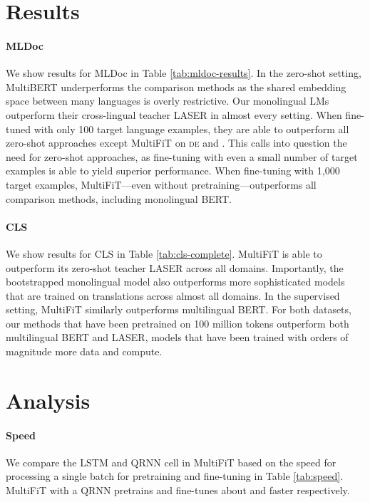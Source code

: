 \documentclass[11pt,a4paper]{article}
\newcommand{\de}{\textsc{de}\xspace}
\begin{document}
\section{Results} \label{sec:results}



\paragraph{MLDoc} We show results for MLDoc in Table \ref{tab:mldoc-results}. In the zero-shot setting, MultiBERT underperforms the comparison methods as the shared embedding space between many languages is overly restrictive. Our monolingual LMs outperform their cross-lingual teacher LASER in almost every setting. When fine-tuned with only 100 target language examples, they are able to outperform all zero-shot approaches except MultiFiT on \de{} and \fr. This calls into question the need for zero-shot approaches, as fine-tuning with even a small number of target examples is able to yield superior performance. When fine-tuning with 1,000 target examples, MultiFiT---even without pretraining---outperforms all comparison methods, including monolingual BERT.

\paragraph{CLS} We show results for CLS in Table \ref{tab:cls-complete}. MultiFiT is able to outperform its zero-shot teacher LASER across all domains. Importantly, the bootstrapped monolingual model also outperforms more sophisticated models that are trained on translations across almost all domains. In the supervised setting, MultiFiT similarly outperforms multilingual BERT. For both datasets, our methods that have been pretrained on 100 million tokens outperform both multilingual BERT and LASER, models that have been trained with orders of magnitude more data and compute.




\section{Analysis}

\paragraph{Speed} We compare the LSTM and QRNN cell in MultiFiT based on the speed for processing a single batch for pretraining and fine-tuning in Table \ref{tab:speed}. MultiFiT with a QRNN pretrains and fine-tunes about  and  faster respectively. 
\end{document}
